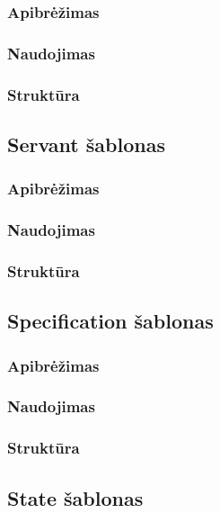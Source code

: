 \documentclass[10pt]{IEEEtran}
\begin{document}
			\subsubsection{Apibrėžimas}

			\subsubsection{Naudojimas}

			\subsubsection{Struktūra}

		
		\subsection{Servant šablonas}

			\subsubsection{Apibrėžimas}

			\subsubsection{Naudojimas}

			\subsubsection{Struktūra}

		\subsection{Specification šablonas}

			\subsubsection{Apibrėžimas}

			\subsubsection{Naudojimas}

			\subsubsection{Struktūra}


		\subsection{State šablonas}
\end{document}
